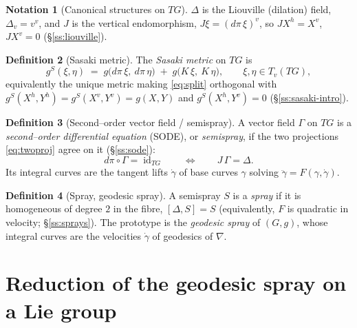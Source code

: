 \documentclass[11pt]{article}
\theoremstyle{definition}
\newtheorem{definition}{Definition}[section]
\newtheorem{notation}[definition]{Notation}
\theoremstyle{plain}
\newcommand{\id}{\operatorname{id}}
\newcommand{\dpi}{d\pi}
\newcommand{\hor}[1]{#1^{h}}
\newcommand{\ver}[1]{#1^{v}}
\newcommand{\TG}{TG}
\newcommand{\Liou}{\Delta}
\newcommand{\gS}{g^{S}}
\begin{document}
\begin{notation}[Canonical structures on $\TG$]\label{not:canon}
$\Liou$ is the Liouville (dilation) field, $\Liou_v=\ver{v}$, and $J$ is the vertical
endomorphism, $J\xi=\ver{(\dpi\,\xi)}$, so $J\hor{X}=\ver{X}$, $J\ver{X}=0$
(\S\ref{ss:liouville}).
\end{notation}

\begin{definition}[Sasaki metric]\label{def:sasaki}
The \emph{Sasaki metric} on $\TG$ is
\begin{equation}\label{eq:sasaki}
  \gS(\xi,\eta)\;=\;g\bigl(\dpi\,\xi,\ \dpi\,\eta\bigr)
                 \;+\;g\bigl(K\,\xi,\ K\,\eta\bigr),
  \qquad \xi,\eta\in T_v(\TG),
\end{equation}
equivalently the unique metric making \eqref{eq:split} orthogonal with
$\gS(\hor{X},\hor{Y})=\gS(\ver{X},\ver{Y})=g(X,Y)$ and $\gS(\hor{X},\ver{Y})=0$
(\S\ref{ss:sasaki-intro}).
\end{definition}

\begin{definition}[Second--order vector field / semispray]\label{def:sode}
A vector field $\Gamma$ on $\TG$ is a \emph{second--order differential equation} (SODE), or
\emph{semispray}, if the two projections \eqref{eq:twoproj} agree on it (\S\ref{ss:sode}):
\begin{equation}\label{eq:sode}
  \dpi\circ\Gamma=\id_{\TG}
  \qquad\Longleftrightarrow\qquad
  J\,\Gamma=\Liou .
\end{equation}
Its integral curves are the tangent lifts $\dot\gamma$ of base curves $\gamma$ solving
$\ddot\gamma=F(\gamma,\dot\gamma)$.
\end{definition}

\begin{definition}[Spray, geodesic spray]\label{def:spray}
A semispray $S$ is a \emph{spray} if it is homogeneous of degree $2$ in the fibre,
$[\Liou,S]=S$ (equivalently, $F$ is quadratic in velocity; \S\ref{ss:sprays}). The
prototype is the \emph{geodesic spray} of $(G,g)$, whose integral curves are the velocities
$\dot\gamma$ of geodesics of $\nabla$.
\end{definition}

\section{Reduction of the geodesic spray on a Lie group}\label{sec:reduction}
\end{document}
